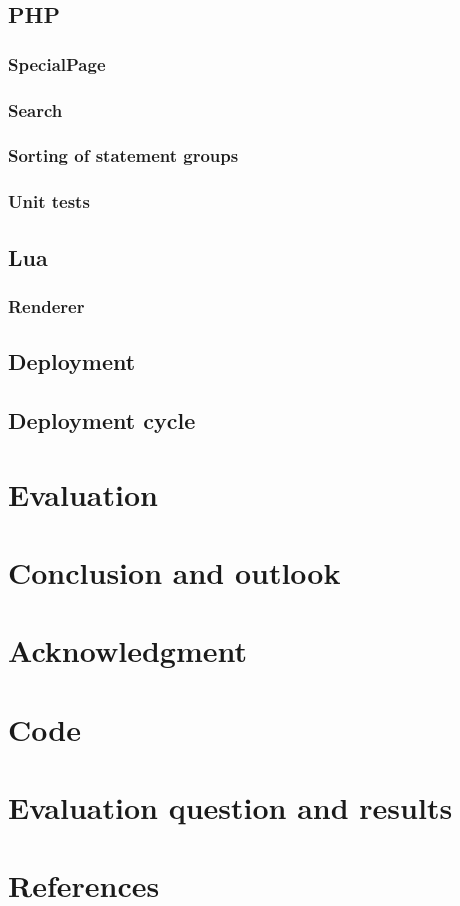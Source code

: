 \documentclass[11pt]{article}
\begin{document}
  \subsection {PHP}
  \subsubsection {SpecialPage}
  \subsubsection {Search}
  \subsubsection{Sorting of statement groups}
  \subsubsection {Unit tests}
  
  \subsection {Lua}
  \subsubsection {Renderer}
  
  \subsection[deploy]{Deployment}
  \subsection{Deployment cycle}

  \section{Evaluation}

  \section{Conclusion and outlook}

  \section{Acknowledgment}

  \section{Code}

  \section{Evaluation question and results}

  \section{References}
\end{document}
